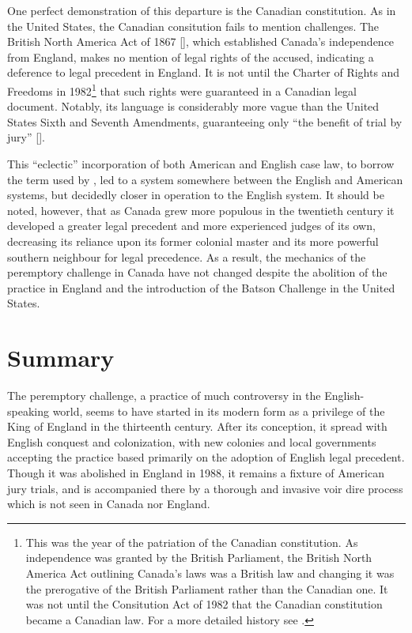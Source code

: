 One perfect demonstration of this departure is the Canadian constitution. As in the United States, the Canadian consitution fails
to mention challenges. The British North America Act of 1867 [\cite{canadaconst}], which established Canada's independence from
England, makes no mention of legal rights of the accused, indicating a deference to legal precedent in England. It is not until
the Charter of Rights and Freedoms in 1982\footnote{This was the year
  of the patriation of the Canadian constitution. As
  independence was granted by the British Parliament, the British North America Act outlining Canada's laws was a British law and
  changing it was the prerogative of the British Parliament rather than the Canadian one. It was not until the Consitution Act of
  1982 that the Canadian constitution became a Canadian law. For a more detailed history see \cite{sheppard2018}.} that such
rights were guaranteed in a Canadian legal document. Notably, its language is considerably more vague than the United States Sixth
and Seventh Amendments, guaranteeing only ``the benefit of trial by jury'' [\cite{canadaconst}].

This ``eclectic'' incorporation of both American and English case law, to borrow the term used by \cite{brown2000}, led to a
system somewhere between the English and American systems, but decidedly closer in operation to the English system. It should be
noted, however, that as Canada grew more populous in the twentieth century it developed a greater legal precedent and more
experienced judges of its own, decreasing its reliance upon its former
colonial master and its more powerful southern neighbour for legal
precedence. As a result, the mechanics of the peremptory challenge in Canada have not changed despite the abolition of
the practice in England and the introduction of the Batson Challenge in the United States.

\section{Summary}

The peremptory challenge, a practice of much controversy in the English-speaking world, seems to have started in its modern form
as a privilege of the King of England in the thirteenth century. After its conception, it spread with English conquest and
colonization, with new colonies and local governments accepting the practice based primarily on the adoption of English legal
precedent. Though it was abolished in England in 1988, it remains a fixture of American jury trials, and is accompanied there by
a thorough and invasive voir dire process which is not seen in Canada nor England.

